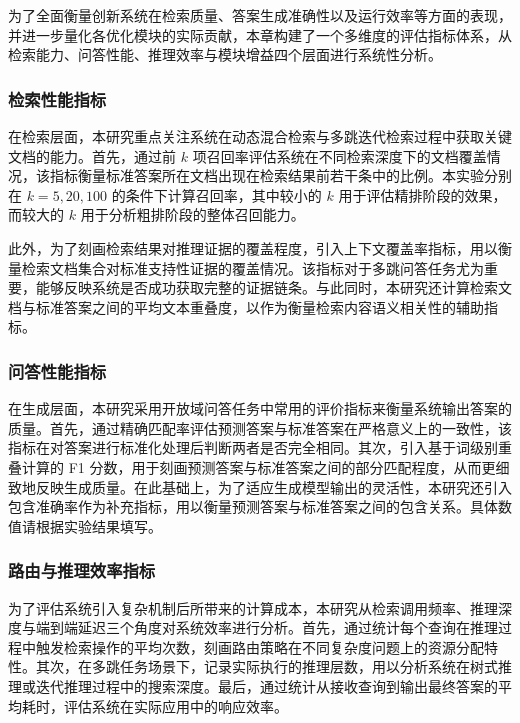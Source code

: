 为了全面衡量创新系统在检索质量、答案生成准确性以及运行效率等方面的表现，并进一步量化各优化模块的实际贡献，本章构建了一个多维度的评估指标体系，从检索能力、问答性能、推理效率与模块增益四个层面进行系统性分析。

\subsubsection{检索性能指标}

在检索层面，本研究重点关注系统在动态混合检索与多跳迭代检索过程中获取关键文档的能力。首先，通过前 $k$ 项召回率评估系统在不同检索深度下的文档覆盖情况，该指标衡量标准答案所在文档出现在检索结果前若干条中的比例。本实验分别在 $k=5, 20, 100$ 的条件下计算召回率，其中较小的 $k$ 用于评估精排阶段的效果，而较大的 $k$ 用于分析粗排阶段的整体召回能力。

此外，为了刻画检索结果对推理证据的覆盖程度，引入上下文覆盖率指标，用以衡量检索文档集合对标准支持性证据的覆盖情况。该指标对于多跳问答任务尤为重要，能够反映系统是否成功获取完整的证据链条。与此同时，本研究还计算检索文档与标准答案之间的平均文本重叠度，以作为衡量检索内容语义相关性的辅助指标。

\subsubsection{问答性能指标}

在生成层面，本研究采用开放域问答任务中常用的评价指标来衡量系统输出答案的质量。首先，通过精确匹配率评估预测答案与标准答案在严格意义上的一致性，该指标在对答案进行标准化处理后判断两者是否完全相同。其次，引入基于词级别重叠计算的 F1 分数，用于刻画预测答案与标准答案之间的部分匹配程度，从而更细致地反映生成质量。在此基础上，为了适应生成模型输出的灵活性，本研究还引入包含准确率作为补充指标，用以衡量预测答案与标准答案之间的包含关系。具体数值请根据实验结果填写。

\subsubsection{路由与推理效率指标}

为了评估系统引入复杂机制后所带来的计算成本，本研究从检索调用频率、推理深度与端到端延迟三个角度对系统效率进行分析。首先，通过统计每个查询在推理过程中触发检索操作的平均次数，刻画路由策略在不同复杂度问题上的资源分配特性。其次，在多跳任务场景下，记录实际执行的推理层数，用以分析系统在树式推理或迭代推理过程中的搜索深度。最后，通过统计从接收查询到输出最终答案的平均耗时，评估系统在实际应用中的响应效率。

